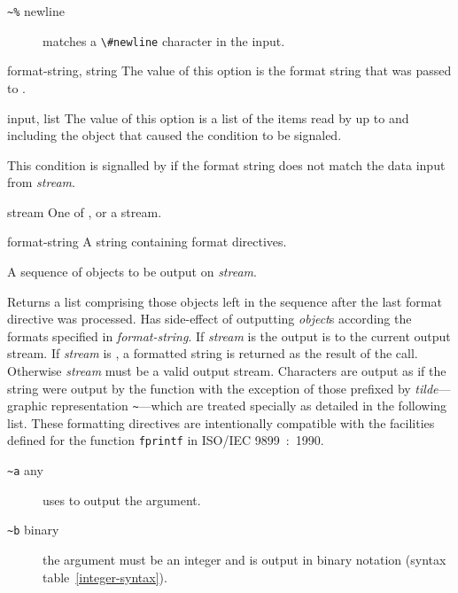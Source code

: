 \begin{optDefinition}
\begin{description}
    \item[{\tt\textasciitilde \%} newline] matches a \verb+\#newline+ character in the
    input.
\end{description}

%
\begin{initoptions}
    \item[format-string, string] The value of this option is the format string
    that was passed to .
    \item[input, list] The value of this option is a list of the items read by
     up to and including the object that caused the condition
    to be signaled.
\end{initoptions}
%
\remarks%
This condition is signalled by  if the format string does not
match the data input from {\em stream}.

%
\begin{arguments}
    \item[stream] One of \nil, \true\/ or a stream.
    \item[format-string] A string containing format directives.
    \item[\optional{object$_1$ \ldots}] A sequence of objects to be output
    on {\em stream}.
\end{arguments}
%
\result%
Returns a list comprising those objects left in the sequence after the
last format directive was processed.
%
\remarks%
Has side-effect of outputting {\em object\/}s according the formats specified in
{\em format-string}.  If {\em stream\/} is \true\/ the output is to the current
output stream.  If {\em stream\/} is \nil, a formatted string is returned as the
result of the call.  Otherwise {\em stream\/} must be a valid output stream.
Characters are output as if the string were output by the 
function with the exception of those prefixed by {\em tilde\/}---graphic
representation {\tt\textasciitilde}---which are treated specially as detailed in
the following list.  These formatting directives are intentionally compatible
with the facilities defined for the function {\tt fprintf} in ISO/IEC
9899~:~1990.
%
\begin{description}
    \item[{\tt\textasciitilde a} any]%
    uses  to output the argument.

    \item[{\tt\textasciitilde b} binary]%
    the argument must be an integer and is output in binary notation
    (syntax table~\ref{integer-syntax}).


\end{description}
\end{optDefinition}
